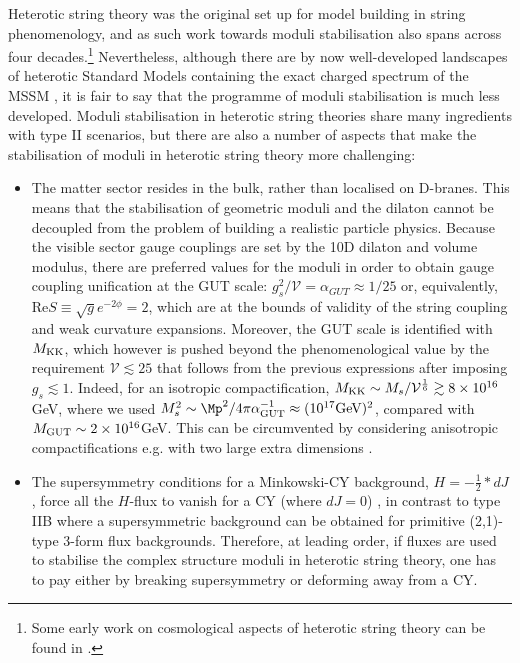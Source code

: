 Heterotic string theory was the original set up for model building in string phenomenology, and as such work towards moduli stabilisation also spans across four decades.\footnote{Some early work on cosmological aspects of heterotic string theory can be found in \cite{Kogan:1986tg, Kogan:1986fx, Khlopov:2002gg}.} Nevertheless, although there are by now well-developed landscapes of heterotic Standard Models containing the exact charged spectrum of the MSSM \cite{Lebedev:2006kn, Lebedev:2008un, Anderson:2011ns, Anderson:2012yf, Anderson:2013xka}, it is fair to say that the programme of moduli stabilisation is much less developed.  Moduli stabilisation in heterotic string theories share many ingredients with type II scenarios, but there are also a number of aspects that make the stabilisation of moduli in heterotic string theory more challenging:
\begin{itemize}
\item The matter sector resides in the bulk, rather than localised on D-branes.  This means that the stabilisation of geometric moduli and the dilaton cannot be decoupled from the problem of building a realistic particle physics.  Because the visible sector gauge couplings are set by the 10D dilaton and volume modulus, there are preferred values for the moduli in order to obtain gauge coupling unification at the GUT scale: $g_s^2/\mathcal{V}=\alpha_{GUT}\approx 1/25$ or, equivalently, $\textrm{Re} S \equiv \sqrt{g} e^{-2\phi}=2$, which are at the bounds of validity of the string coupling and weak curvature expansions.  Moreover, the GUT scale is identified with $M_{\rm KK}$, which however is pushed beyond the phenomenological value by the requirement $\mathcal{V} \lesssim 25$ that follows from the previous expressions after imposing $g_s \lesssim 1$.  Indeed, for an isotropic compactification, $M_{\rm KK}\sim M_s/\mathcal{V}^\frac16 \gtrsim 8 \times 10^{16}\,$GeV, where we used $M_s^2 \sim \Mp^2/4\pi \alpha_{\rm GUT}^{-1} \approx (10^{17} \textrm{GeV})^2$, compared with $M_{\rm GUT} \sim 2 \times 10^{16}$GeV.  This can be circumvented by considering anisotropic compactifications e.g. with two large extra dimensions \cite{Hebecker:2004ce, Dundee:2008ts, Buchmuller:2007qf, Loaiza-Brito:2005bto}.

\item The supersymmetry conditions for a Minkowski-CY background, $H = -\frac12 *dJ$, force all the $H$-flux to vanish for a CY (where $dJ=0$) \cite{Strominger:1986uh}, in contrast to type IIB where a supersymmetric background can be obtained for primitive (2,1)-type 3-form flux backgrounds.  Therefore, at leading order, if fluxes are used to stabilise the complex structure moduli in heterotic string theory, one has to pay either by breaking supersymmetry or deforming away from a CY.


\end{itemize}
